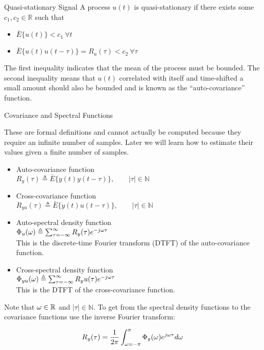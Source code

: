 \begin{definition}{Quasi-stationary Signal}%
\label{def:quasistationary}
A process $u(t)$ is quasi-stationary if there exists some $c_1, c_2 \in\mathbb{R}$ such that
\begin{itemize}
\item $\bar{E}\{u(t)\} < c_1~\forall t$
\item $\bar{E}\{u(t)u(t-\tau)\} = R_u(\tau) < c_2~\forall \tau$
\end{itemize}
The first inequality indicates that the mean of the process must be bounded.
The second inequality means that $u(t)$ correlated with itself and time-shifted a small amount should also be bounded and is known as the ``auto-covariance'' function.
\end{definition}

\begin{definition}{Covariance and Spectral Functions}

These are formal definitions and cannot actually be computed because they require an infinite number of samples.
Later we will learn how to estimate their values given a finite number of samples.
\begin{itemize}
\item Auto-covariance function \\
$R_y(\tau) \triangleq \bar{E}\{y(t)y(t-\tau)\}, \qquad |\tau|\in\mathbb{N}$
\item Cross-covariance function \\
$R_{yu}(\tau) \triangleq \bar{E}\{y(t)u(t-\tau)\}, \qquad |\tau|\in\mathbb{N}$
\item Auto-spectral density function \\
$\Phi_u(\omega) \triangleq \sum_{\tau=-\infty}^\infty R_y(\tau)e^{-j\omega\tau}$ \\
This is the discrete-time Fourier transform (DTFT) of the auto-covariance function.
\item Cross-spectral density function \\
$\Phi_{yu}(\omega) \triangleq \sum_{\tau=-\infty}^\infty R_y u(\tau)e^{-j\omega\tau}$ \\
This is the DTFT of the cross-covariance function.
\end{itemize}
Note that $\omega\in\mathbb{R}$ and $|\tau|\in\mathbb{N}$.
To get from the spectral density functions to the covariance functions use the inverse Fourier transform:

\begin{equation*}
R_y(\tau) = \frac{1}{2\pi}\int_{\omega=-\pi}^\pi \Phi_y(\omega)e^{j\omega\tau}d\omega
\end{equation*}

\end{definition}

